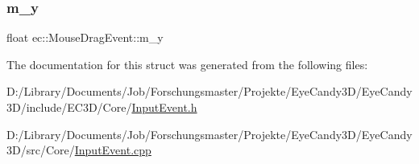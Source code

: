 \subsubsection{\texorpdfstring{m\+\_\+y}{m\_y}}
{\footnotesize\ttfamily float ec\+::\+Mouse\+Drag\+Event\+::m\+\_\+y}



The documentation for this struct was generated from the following files\+:\begin{DoxyCompactItemize}
\item 
D\+:/\+Library/\+Documents/\+Job/\+Forschungsmaster/\+Projekte/\+Eye\+Candy3\+D/\+Eye\+Candy3\+D/include/\+E\+C3\+D/\+Core/\mbox{\hyperlink{_input_event_8h}{Input\+Event.\+h}}\item 
D\+:/\+Library/\+Documents/\+Job/\+Forschungsmaster/\+Projekte/\+Eye\+Candy3\+D/\+Eye\+Candy3\+D/src/\+Core/\mbox{\hyperlink{_input_event_8cpp}{Input\+Event.\+cpp}}\end{DoxyCompactItemize}
